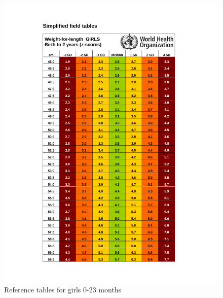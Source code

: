 \documentclass[
  12pt,
]{book}
\begin{document}
\begin{figure}[H]

{\centering \includegraphics[width=1\linewidth]{pdf/girls_0_24} 

}

\caption{Reference tables for girls 0-23 months}\label{fig:anthro1-3}
\end{figure}
\end{document}
